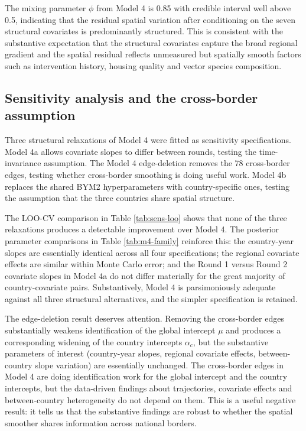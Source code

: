 \documentclass{article}
\begin{document}
The mixing parameter \(\phi\) from Model 4 is 0.85 with credible
interval well above 0.5, indicating that the residual spatial variation
after conditioning on the seven structural covariates is predominantly
structured. This is consistent with the substantive expectation that the
structural covariates capture the broad regional gradient and the
spatial residual reflects unmeasured but spatially smooth factors such
as intervention history, housing quality and vector species composition.

\subsection{Sensitivity analysis and the cross-border
assumption}\label{sensitivity-analysis-and-the-cross-border-assumption}

Three structural relaxations of Model 4 were fitted as sensitivity
specifications. Model 4a allows covariate slopes to differ between
rounds, testing the time-invariance assumption. The Model 4
edge-deletion removes the 78 cross-border edges, testing whether
cross-border smoothing is doing useful work. Model 4b replaces the
shared BYM2 hyperparameters with country-specific ones, testing the
assumption that the three countries share spatial structure.

The LOO-CV comparison in Table \ref{tab:sens-loo} shows that none of the
three relaxations produces a detectable improvement over Model 4. The
posterior parameter comparisons in Table \ref{tab:m4-family} reinforce
this: the country-year slopes are essentially identical across all four
specifications; the regional covariate effects are similar within Monte
Carlo error; and the Round 1 versus Round 2 covariate slopes in Model 4a
do not differ materially for the great majority of country-covariate
pairs. Substantively, Model 4 is parsimoniously adequate against all
three structural alternatives, and the simpler specification is
retained.

The edge-deletion result deserves attention. Removing the cross-border
edges substantially weakens identification of the global intercept
\(\mu\) and produces a corresponding widening of the country intercepts
\(\alpha_c\), but the substantive parameters of interest (country-year
slopes, regional covariate effects, between-country slope variation) are
essentially unchanged. The cross-border edges in Model 4 are doing
identification work for the global intercept and the country intercepts,
but the data-driven findings about trajectories, covariate effects and
between-country heterogeneity do not depend on them. This is a useful
negative result: it tells us that the substantive findings are robust to
whether the spatial smoother shares information across national borders.
\end{document}
